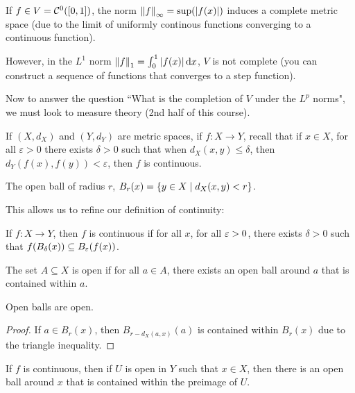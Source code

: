 \begin{example}
    If $f \in V = \mathcal C^0([0, 1])$, the norm $\norm{f}_\infty = \sup(\abs{f(x)})$ induces a complete metric space (due to the limit of uniformly continous functions converging to a continuous function).

    However, in the $L^1$ norm $\norm{f}_1 = \int_0^1 \abs{f(x)} \dd{x}$, $V$ is not complete (you can construct a sequence of functions that converges to a step function).
\end{example}

Now to answer the question ``What is the completion of $V$ under the $L^p$ norms", we must look to measure theory (2nd half of this course).

If $(X, d_X)$ and $(Y, d_Y)$ are metric spaces, if $f \colon X \to Y$, recall that if $x \in X$, for all $\varepsilon > 0$ there exists $\delta > 0$ such that when $d_X(x, y) \le \delta$, then $d_Y(f(x), f(y)) < \varepsilon$, then $f$ is continuous.

\begin{definition}
    The open ball of radius $r$, $B_r(x) = \qty{y \in X \mid d_X(x, y) < r}$.
\end{definition}

This allows us to refine our definition of continuity:
\begin{definition}[Continuity]
    If $f \colon X \to Y$, then $f$ is continuous if for all $x$, for all $\varepsilon > 0$, there exists $\delta > 0$ such that $f(B_\delta(x)) \subseteq B_\varepsilon(f(x))$.
\end{definition}

\begin{definition}
    The set $A \subseteq X$ is open if for all $a \in A$, there exists an open ball around $a$ that is contained within $a$.
\end{definition}

\begin{proposition}
    Open balls are open.
\end{proposition}

\begin{proof}
    If $a \in B_r(x)$, then $B_{r - d_X(a, x)}(a)$ is contained within $B_r(x)$ due to the triangle inequality.
\end{proof}

\begin{proposition}
    If $f$ is continuous, then if $U$ is open in $Y$ such that $x \in X$, then there is an open ball around $x$ that is contained within the preimage of $U$.
\end{proposition}

